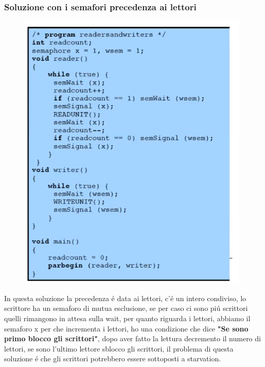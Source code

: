 \subsubsection*{Soluzione con i semafori precedenza ai lettori}
\begin{figure}[H]
    \centering
    \includegraphics[width=0.7\linewidth]{immagini/ScrittoriLettoriSemafori}
\end{figure}
In questa soluzione la precedenza é data ai lettori, c'é un intero condiviso, lo scrittore ha un semaforo di mutua esclusione,
se per caso ci sono piú scrittori quelli rimangono in attesa sulla wait, per quanto riguarda i lettori, abbiamo il semaforo x
per che incrementa i lettori, ho una condizione che dice \textbf{"Se sono primo blocco gli scrittori"},  dopo aver fatto la lettura
decremento il numero di lettori, se sono l'ultimo lettore sblocco gli scrittori, il problema di questa soluzione é che gli scrittori
potrebbero essere sottoposti a starvation.
